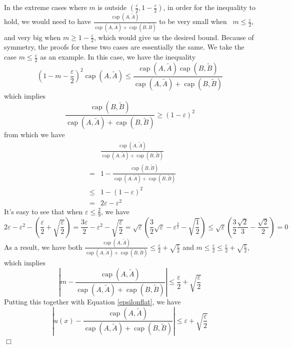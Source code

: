 \documentclass[english, aip, jcp, priprint, graphicx]{revtex4-1}
\newcommand{\tmop}[1]{\ensuremath{\operatorname{#1}}}
\theoremstyle{plain}
\theoremstyle{definition}
\theoremstyle{plain}
\begin{document}
In the extreme cases where $m$ is outside $\left( \frac{\varepsilon}{2}, 1 - \frac{\varepsilon}{2} \right)$, in order for the inequality to hold, we would need to have $\frac{\tmop{cap} (A, \tilde{A})}{\tmop{cap} (A, \tilde{A}) + \tmop{cap} (B, \tilde{B})}$ to be very small when \ $m \leqslant \frac{\varepsilon}{2}$, and very big when $m \geqslant 1 - \frac{\varepsilon}{2}$, which would give us the desired bound. Because of symmetry, the proofs for these two cases are essentially the same. We take the case $m \leqslant \frac{\varepsilon}{2}$ as an example. In this case, we have the inequality
\[ \left( 1 - m - \frac{\varepsilon}{2} \right)^2 \tmop{cap} (A, \tilde{A})
\leqslant \frac{\tmop{cap} (A, \tilde{A}) \tmop{cap} (B,
\tilde{B})}{\tmop{cap} (A, \tilde{A}) + \tmop{cap} (B, \tilde{B})} \]
which implies
\[ \frac{\tmop{cap} (B, \tilde{B})}{\tmop{cap} (A, \tilde{A}) + \tmop{cap} (B,
\tilde{B})} \geqslant (1 - \varepsilon)^2 \]
from which we have
\begin{eqnarray*}
&  & \frac{\tmop{cap} (A, \tilde{A})}{\tmop{cap} (A, \tilde{A}) +
\tmop{cap} (B, \tilde{B})}\\
& = & 1 - \frac{\tmop{cap} (B, \tilde{B})}{\tmop{cap} (A, \tilde{A}) +
\tmop{cap} (B, \tilde{B})}\\
& \leqslant & 1 - (1 - \varepsilon)^2\\
& = & 2 \varepsilon - \varepsilon^2
\end{eqnarray*}
It's easy to see that when $\varepsilon \leqslant \frac{2}{9}$, we have
\[ 2 \varepsilon - \varepsilon^2 - \left( \frac{\varepsilon}{2} +
\sqrt{\frac{\varepsilon}{2}} \right) = \frac{3 \varepsilon}{2} -
\varepsilon^2 - \sqrt{\frac{\varepsilon}{2}} = \sqrt{\varepsilon} \left(
\frac{3}{2} \sqrt{\varepsilon} - \varepsilon^{\frac{3}{2}} -
\sqrt{\frac{1}{2}} \right) \leqslant \sqrt{\varepsilon} \left( \frac{3}{2}
\frac{\sqrt{2}}{3} - \frac{\sqrt{2}}{2} \right) = 0 \]
As a result, we have both $\frac{\tmop{cap} (A, \tilde{A})}{\tmop{cap} (A, \tilde{A}) + \tmop{cap} (B, \tilde{B})} \leqslant \frac{\varepsilon}{2} + \sqrt{\frac{\varepsilon}{2}}$ and $m \leqslant \frac{\varepsilon}{2} \leqslant \frac{\varepsilon}{2} + \sqrt{\frac{\varepsilon}{2}}$, which implies
\[ \left| m - \frac{\tmop{cap} (A, \tilde{A})}{\tmop{cap} (A, \tilde{A}) +
\tmop{cap} (B, \tilde{B})} \right| \leqslant \frac{\varepsilon}{2} +
\sqrt{\frac{\varepsilon}{2}} \]
Putting this together with Equation \ref{epsilonflat}, we have
\[ \left| u (x) - \frac{\tmop{cap} (A, \tilde{A})}{\tmop{cap} (A, \tilde{A}) +
\tmop{cap} (B, \tilde{B})} \right| \leqslant \varepsilon +
\sqrt{\frac{\varepsilon}{2}} \]
\hspace*{\fill}$\Box$\medskip
\end{document}
